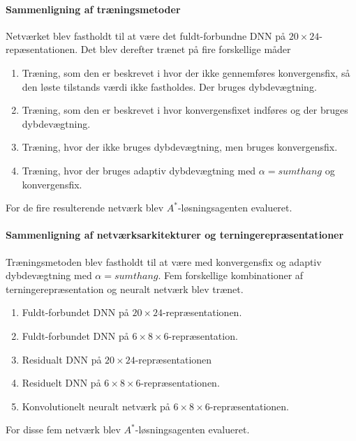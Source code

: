 \documentclass[../main.tex]{subfiles}
\begin{document}
\paragraph{Sammenligning af træningsmetoder}
Netværket blev fastholdt til at være det fuldt-forbundne DNN på \(20\times24\)-repæsentationen. 
Det blev derefter trænet på fire forskellige måder
\begin{enumerate}
	\item Træning, som den er beskrevet i \cite{HumansBeGone} hvor der ikke gennemføres konvergensfix, så den løste tilstands værdi ikke fastholdes. 
		Der bruges dybdevægtning.
	\item Træning, som den er beskrevet i \cite{RubiksMedium} hvor konvergensfixet indføres og der bruges dybdevægtning.
	\item Træning, hvor der ikke bruges dybdevægtning, men bruges konvergensfix.
	\item Træning, hvor der bruges adaptiv dybdevægtning med \(\alpha=sumthang\) og konvergensfix. 
\end{enumerate}
For de fire resulterende netværk blev \(A^*\)-løsningsagenten evalueret.

\paragraph{Sammenligning af netværksarkitekturer og terningerepræsentationer}
Træningsmetoden blev fastholdt til at være med konvergensfix og adaptiv dybdevægtning med \(\alpha=sumthang\).
Fem forskellige kombinationer af terningerepræsentation og neuralt netværk blev trænet.
\begin{enumerate}
	\item Fuldt-forbundet DNN på \(20\times24\)-repræsentationen.
	\item Fuldt-forbundet DNN på \(6\times8\times6\)-repræsentation.
	\item Residualt DNN på \(20\times24\)-repræsentationen
	\item Residuelt DNN på \(6\times8\times6\)-repræsentationen.
	\item Konvolutionelt neuralt netværk på \(6\times8\times6\)-repræsentationen.
\end{enumerate}
For disse fem netværk blev \(A^*\)-løsningsagenten evalueret.
\end{document}

